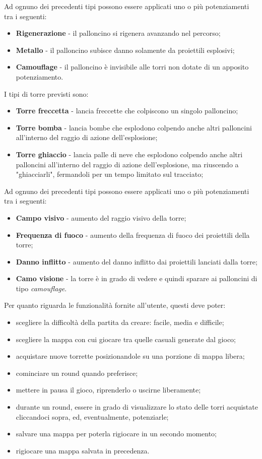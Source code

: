 Ad ognuno dei precedenti tipi possono essere applicati uno o più potenziamenti tra i seguenti:
\begin{itemize}
    \item \textbf{Rigenerazione} - il palloncino si rigenera avanzando nel percorso;
    \item \textbf{Metallo} - il palloncino subisce danno solamente da proiettili esplosivi;
    \item \textbf{Camouflage} - il palloncino è invisibile alle torri non dotate di un apposito potenziamento.
\end{itemize}
I tipi di torre previsti sono:
\begin{itemize}
    \item \textbf{Torre freccetta} - lancia freccette che colpiscono un singolo palloncino;
    \item \textbf{Torre bomba} - lancia bombe che esplodono colpendo anche altri palloncini all'interno del raggio di azione dell'esplosione;
    \item \textbf{Torre ghiaccio} - lancia palle di neve che esplodono colpendo anche altri palloncini all'interno del raggio di azione dell'esplosione, ma riuscendo a "ghiacciarli", fermandoli per un tempo limitato sul tracciato;
\end{itemize}
Ad ognuno dei precedenti tipi possono essere applicati uno o più potenziamenti tra i seguenti:
\begin{itemize}
    \item \textbf{Campo visivo} - aumento del raggio visivo della torre;
    \item \textbf{Frequenza di fuoco} - aumento della frequenza di fuoco dei proiettili della torre;
    \item \textbf{Danno inflitto} - aumento del danno inflitto dai proiettili lanciati dalla torre;
    \item \textbf{Camo visione} - la torre è in grado di vedere e quindi sparare ai palloncini di tipo \textit{camouflage}.
\end{itemize}
Per quanto riguarda le funzionalità fornite all'utente, questi deve poter:
\begin{itemize}
    \item scegliere la difficoltà della partita da creare: facile, media e difficile;
    \item scegliere la mappa con cui giocare tra quelle casuali generate dal gioco;
    \item acquistare nuove torrette posizionandole su una porzione di mappa libera;
    \item cominciare un round quando preferisce;
    \item mettere in pausa il gioco, riprenderlo o uscirne liberamente;
    \item durante un round, essere in grado di visualizzare lo stato delle torri acquistate cliccandoci sopra, ed, eventualmente, potenziarle;
    \item salvare una mappa per poterla rigiocare in un secondo momento;
    \item rigiocare una mappa salvata in precedenza.
\end{itemize}

